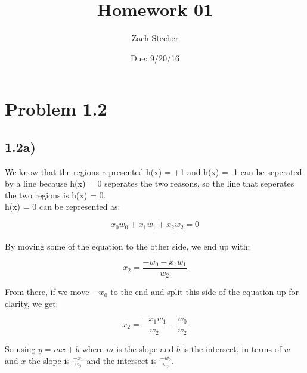 \documentclass[11pt]{article}
\title{Homework 01}
\author{Zach Stecher}
\date{Due: 9/20/16}
\begin{document}
\lstset{language=Python}

\maketitle

\section*{Problem 1.2}
\subsection*{1.2a)}

We know that the regions represented h(x) = +1 and h(x) = -1 can be seperated by a line because h(x) = 0 seperates the two reasons, so the line that seperates the two regions is h(x) = 0.
\\

h(x) = 0 can be represented as:

\begin{equation}
	x_0w_0 + x_1w_1 + x_2w_2 = 0
\end{equation}
\\

By moving some of the equation to the other side, we end up with:

\begin{equation}
	x_2 = \frac{-w_0 - x_1w_1}{w_2}
\end{equation}

From there, if we move $-w_0$ to the end and split this side of the equation up for clarity, we get:

\begin{equation}
	x_2 = \frac{-x_1w_1}{w_2} - \frac{w_0}{w_2}
\end{equation}

So using $y = mx + b$ where $m$ is the slope and $b$ is the intersect, in terms of $w$ and $x$ the slope is $\frac{-x_1}{w_2}$ and the intersect is $\frac{-w_0}{w_2}$.
\\
\end{document}
